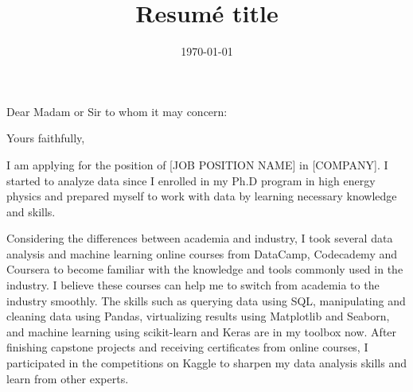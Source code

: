 \documentclass[11pt,letterpaper]{moderncv}   %
\title{Resumé title}                               %
\begin{document}
%
%

\date{\today}

\opening{Dear Madam or Sir to whom it may concern:}
\closing{Yours faithfully,} %

\makelettertitle

%
%
%
%

\justifying
I am applying for the position of [JOB POSITION NAME] in [COMPANY].
I started to analyze data since I enrolled in my Ph.D program in high energy physics and prepared myself to work with data by learning necessary knowledge and skills.


Considering the differences between academia and industry, I took several data analysis and machine learning online courses from DataCamp, Codecademy and Coursera to become familiar with the knowledge and tools commonly used in the industry.
I believe these courses can help me to switch from academia to the industry smoothly.
The skills such as querying data using SQL, manipulating and cleaning data using Pandas, virtualizing results using Matplotlib and Seaborn, and machine learning using scikit-learn and Keras are in my toolbox now.
After finishing capstone projects and receiving certificates from online courses, I participated in the competitions on Kaggle to sharpen my data analysis skills and learn from other experts.
\end{document}
